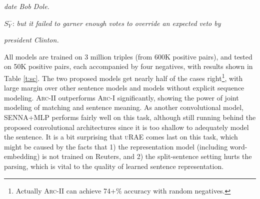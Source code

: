\documentclass{article} \usepackage{nips14submit_e,times}
\newcommand{\0}{\ensuremath{\mathbf{0}}}
\newcommand{\1}{\ensuremath{\mathbf{1}}}
\begin{document}
\hspace{20pt}\emph{\small date Bob Dole.} \vspace{-3pt}


$S_Y^-$: \emph{\small but it failed to garner enough votes to override an expected veto by}\vspace{-5pt}

\hspace{20pt}\emph{\small  president Clinton.} \vspace{-3pt}

\vspace{-2pt}
All models are trained on 3 million triples (from 600K positive pairs), and tested on 50K positive pairs, each accompanied by four negatives, with results shown in Table \ref{t:sc}. The two proposed models get nearly half of the cases right\footnote{Actually \textsc{Arc-II} can achieve 74+\% accuracy with random negatives.},
with large margin over other sentence models and models without explicit sequence modeling. \textsc{Arc-II} outperforms \textsc{Arc-I} significantly, showing the power of joint modeling of matching and sentence meaning. As another convolutional model, \textsc{SENNA+MLP} performs fairly well on this task, although  still running behind the proposed convolutional architectures since it is too shallow to adequately model the sentence. It is a bit surprising that \textsc{uRAE} comes last on this task, which might be caused by the facts that 1) the representation model (including word-embedding) is not trained on Reuters, and 2) the split-sentence setting hurts the parsing, which is vital to the quality of learned sentence representation.
\end{document}

